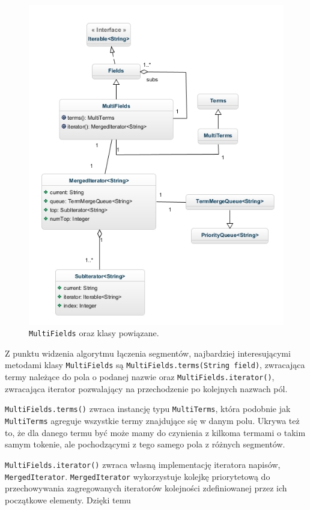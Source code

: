 \begin{figure}[here]
 \label{multiFields}
 \includegraphics[scale=0.7]{MultiFields.jpg}
 \caption{\texttt{MultiFields} oraz klasy powiązane.}
\end{figure}

Z punktu widzenia algorytmu łączenia segmentów, najbardziej interesującymi metodami klasy \texttt{MultiFields} są \texttt{MultiFields.terms(String field)}, zwracająca termy należące do pola o podanej nazwie oraz \texttt{MultiFields.iterator()}, zwracająca iterator pozwalający na przechodzenie po kolejnych nazwach pól. 

\texttt{MultiFields.terms()} zwraca instancję typu \texttt{MultiTerms}, która podobnie jak \texttt{MultiTerms} agreguje wszystkie termy znajdujące się w danym polu. Ukrywa też to, że dla danego termu być może mamy do czynienia z kilkoma termami o takim samym tokenie, ale pochodzącymi z tego samego pola z różnych segmentów.

\texttt{MultiFields.iterator()} zwraca własną implementację iteratora napisów, \texttt{MergedIterator}. \texttt{MergedIterator} wykorzystuje kolejkę priorytetową do przechowywania zagregowanych iteratorów kolejności zdefiniowanej przez ich początkowe elementy. Dzięki temu 